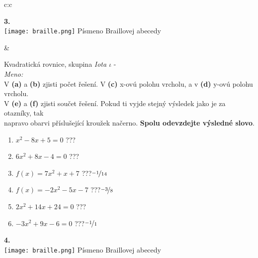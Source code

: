 \documentclass[10pt]{report}
\begin{document}
\begin{tabular}{c:c}
\begin{minipage}[c][99mm][t]{0.49\linewidth}
\begin{center}
\begin{minipage}{0.20\linewidth}
\begin{center}
{\Huge\bfseries 3.} \\[2mm]
\texttt{[image: braille.png]}
{\small Písmeno Braillovej abecedy}
\end{center}
\end{minipage}
\end{center}
\end{minipage}
&
\begin{minipage}[c][99mm][t]{0.49\linewidth}
\begin{center}
\vspace{7mm}
{\huge Kvadratická rovnice, skupina \textit{Iota $\iota$} -}\\[4.5mm]
\textit{Meno:}\phantom{xxxxxxxxxxxxxxxxxxxxxxxxxxxxxxxxxxxxxxxxxxxxxxxxxxxxxxxxxxxxxxxxx}\\[3.5mm]
V \textbf{(a)} a \textbf{(b)} zjisti počet řešení. V \textbf{(c)} x-ovú polohu vrcholu, a v \textbf{(d)} y-ovú polohu vrcholu.\\V \textbf{(e)} a \textbf{(f)} zjisti součet řešení. Pokud ti vyjde stejný výsledek jako je za otazníky, tak\\napravo obarvi příslušející kroužek načerno. \textbf{Spolu odevzdejte výsledné slovo}.\\[3mm]
\begin{minipage}{0.77\linewidth}
\begin{center}
\begin{varwidth}{\textwidth}
\begin{enumerate}
\large
\item $x^2-8x+5=0$\quad \dotfill\; ???\;\dotfill {}
\item $6x^2+8x-4=0$\quad \dotfill\; ???\;\dotfill {}
\item $f(x)=7x^2+x+7$\quad \dotfill\; ???\;\dotfill \quad $\nicefrac{-1}{14}$
\item $f(x)=-2x^2-5x-7$\quad \dotfill\; ???\;\dotfill \quad $\nicefrac{-3}{8}$
\item $2x^2+14x+24=0$\quad \dotfill\; ???\;\dotfill {}
\item $-3x^2+9x-6=0$\quad \dotfill\; ???\;\dotfill \quad $\nicefrac{-1}{1}$
\end{enumerate}
\end{varwidth}
\end{center}
\end{minipage}
\begin{minipage}{0.20\linewidth}
\begin{center}
{\Huge\bfseries 4.} \\[2mm]
\texttt{[image: braille.png]}
{\small Písmeno Braillovej abecedy}
\end{center}
\end{minipage}
\end{center}
\end{minipage}

\end{tabular}
\end{document}
